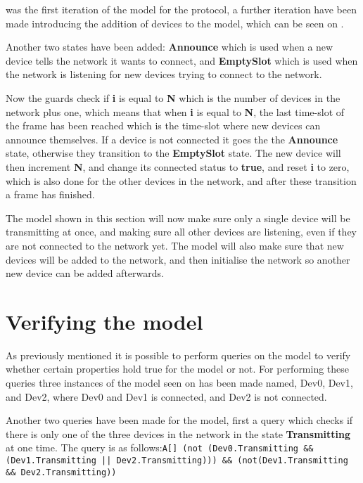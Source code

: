  was the first iteration of the model for the protocol, a further iteration have been made introducing the addition of devices to the model, which can be seen on .

Another two states have been added: \textbf{Announce} which is used when a new device tells the network it wants to connect, and \textbf{EmptySlot} which is used when the network is listening for new devices trying to connect to the network.

Now the guards check if \textbf{i} is equal to \textbf{N} which is the number of devices in the network plus one, which means that when \textbf{i} is equal to \textbf{N}, the last time-slot of the frame has been reached which is the time-slot where new devices can announce themselves.
If a device is not connected it goes the the \textbf{Announce} state, otherwise they transition to the \textbf{EmptySlot} state.
The new device will then increment \textbf{N}, and change its connected status to \textbf{true}, and reset \textbf{i} to zero, which is also done for the other devices in the network, and after these transition a frame has finished.



The model shown in this section will now make sure only a single device will be transmitting at once, and making sure all other devices are listening, even if they are not connected to the network yet.
The model will also make sure that new devices will be added to the network, and then initialise the network so another new device can be added afterwards.

\section{Verifying the model}

As previously mentioned it is possible to perform queries on the model to verify whether certain properties hold true for the model or not.
For performing these queries three instances of the model seen on  has been made named, Dev0, Dev1, and Dev2, where Dev0 and Dev1 is connected, and Dev2 is not connected. 

Another two queries have been made for the model, first a query which checks if there is only one of the three devices in the network in the state \textbf{Transmitting} at one time.
The query is as follows:\texttt{A[] (not (Dev0.Transmitting \&\& (Dev1.Transmitting || Dev2.Transmitting))) \&\& (not(Dev1.Transmitting \&\& Dev2.Transmitting))}

